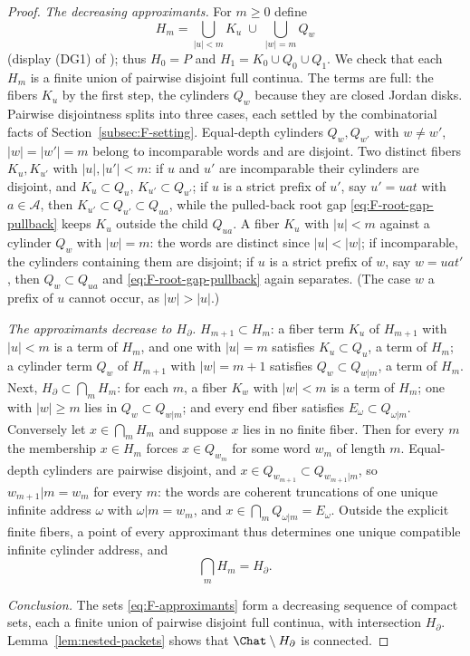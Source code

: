 \begin{proof}
\emph{The decreasing approximants.}
For $m\ge0$ define
\begin{equation}\label{eq:F-approximants}
H_m=\bigcup_{|u|<m}K_u\;\cup\;\bigcup_{|w|=m}Q_w
\end{equation}
(display (DG1) of \cite{MWman}); thus $H_0=P$ and
$H_1=K_0\cup Q_0\cup Q_1$.  We check that each $H_m$ is a finite union of
pairwise disjoint full continua.  The terms are full: the fibers $K_u$ by
the first step, the cylinders $Q_w$ because they are closed Jordan disks.
Pairwise disjointness splits into three cases, each settled by the
combinatorial facts of Section~\ref{subsec:F-setting}.
Equal-depth cylinders $Q_w,Q_{w'}$ with $w\ne w'$, $|w|=|w'|=m$ belong to
incomparable words and are disjoint.  Two distinct fibers $K_u,K_{u'}$
with $|u|,|u'|<m$: if $u$ and $u'$ are incomparable their cylinders are
disjoint, and $K_u\subset Q_u$, $K_{u'}\subset Q_{u'}$; if $u$ is a
strict prefix of $u'$, say $u'=uat$ with $a\in\mathcal A$, then
$K_{u'}\subset Q_{u'}\subset Q_{ua}$, while the pulled-back root gap
\eqref{eq:F-root-gap-pullback} keeps $K_u$ outside the child $Q_{ua}$.
A fiber $K_u$ with $|u|<m$ against a cylinder $Q_w$ with $|w|=m$: the
words are distinct since $|u|<|w|$; if incomparable, the cylinders
containing them are disjoint; if $u$ is a strict prefix of $w$, say
$w=uat'$, then $Q_w\subset Q_{ua}$ and \eqref{eq:F-root-gap-pullback}
again separates.  (The case $w$ a prefix of $u$ cannot occur, as
$|w|>|u|$.)

\emph{The approximants decrease to $H_\partial$.}
$H_{m+1}\subset H_m$: a fiber term $K_u$ of $H_{m+1}$ with $|u|<m$ is a
term of $H_m$, and one with $|u|=m$ satisfies $K_u\subset Q_u$, a term of
$H_m$; a cylinder term $Q_w$ of $H_{m+1}$ with $|w|=m+1$ satisfies
$Q_w\subset Q_{w|m}$, a term of $H_m$.  Next,
$H_\partial\subset\bigcap_mH_m$: for each $m$, a fiber $K_w$ with
$|w|<m$ is a term of $H_m$; one with $|w|\ge m$ lies in
$Q_w\subset Q_{w|m}$; and every end fiber satisfies
$E_\omega\subset Q_{\omega|m}$.  Conversely let
$x\in\bigcap_mH_m$ and suppose $x$ lies in no finite fiber.  Then for
every $m$ the membership $x\in H_m$ forces $x\in Q_{w_m}$ for some word
$w_m$ of length $m$.  Equal-depth cylinders are pairwise disjoint, and
$x\in Q_{w_{m+1}}\subset Q_{w_{m+1}|m}$, so $w_{m+1}|m=w_m$ for every
$m$: the words are coherent truncations of one unique infinite address
$\omega$ with $\omega|m=w_m$, and $x\in\bigcap_mQ_{\omega|m}=E_\omega$.
Outside the explicit finite fibers, a point of every approximant thus
determines one unique compatible infinite cylinder address, and
\[
\bigcap_m H_m=H_\partial .
\]

\emph{Conclusion.}
The sets \eqref{eq:F-approximants} form a decreasing sequence of compact
sets, each a finite union of pairwise disjoint full continua, with
intersection $H_\partial$.  Lemma~\ref{lem:nested-packets} shows that
$\Chat\setminus H_\partial$ is connected.
\end{proof}

